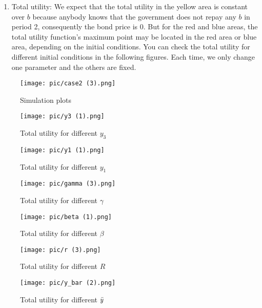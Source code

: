 \documentclass{article}
\begin{document}
\begin{enumerate}
    \item Total utility: We expect that the total utility in the yellow area is constant over $b$ because anybody knows that the government does not repay any $b$ in period 2, consequently the bond price is $0$. But for the red and blue areas, the total utility function's maximum point may be located in the red area or blue area, depending on the initial conditions. You can check the total utility for different initial conditions in the following figures. Each time, we only change one parameter and the others are fixed. 
\end{enumerate}

\begin{figure}[htbp]
\centering
{\texttt{[image: pic/case2 (3).png]}}
\caption{Simulation plots}
\label{fig:Simulation1}
\end{figure}

\begin{figure}[htbp]
\centering
{\texttt{[image: pic/y3 (1).png]}}
\caption{Total utility for different $y_3$}
\end{figure}

\begin{figure}[htbp]
\centering
{\texttt{[image: pic/y1 (1).png]}}
\caption{Total utility for different $y_1$}
\end{figure}

\begin{figure}[htbp]
\centering
{\texttt{[image: pic/gamma (3).png]}}
\caption{Total utility for different $\gamma$}
\end{figure}

\begin{figure}[htbp]
\centering
{\texttt{[image: pic/beta (1).png]}}
\caption{Total utility for different $\beta$}
\end{figure}

\begin{figure}[htbp]
\centering
{\texttt{[image: pic/r (3).png]}}
\caption{Total utility for different $R$}
\end{figure}

\begin{figure}[htbp]
\centering
{\texttt{[image: pic/y\_bar (2).png]}}
\caption{Total utility for different $\Bar{y}$}
\end{figure}
\end{document}
